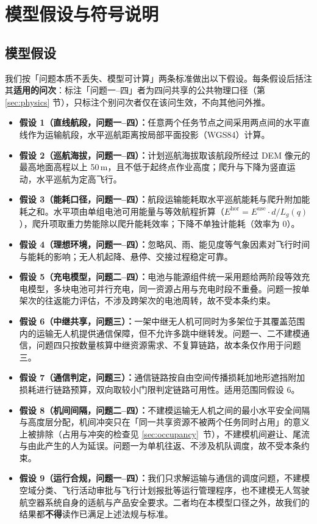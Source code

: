 \section{模型假设与符号说明}

\subsection{模型假设}
我们按「问题本质不丢失、模型可计算」两条标准做出以下假设。每条假设后括注其\textbf{适用的问次}：标注「问题一--四」者为四问共享的公共物理口径（第 \ref{sec:physics} 节），只标注个别问次者仅在该问生效，不向其他问外推。

\begin{itemize}
	\item \textbf{假设 1（直线航段，问题一--四）：}任意两个任务节点之间采用两点间的水平直线作为运输航段，水平巡航距离按局部平面投影（WGS84）计算。
	\item \textbf{假设 2（巡航海拔，问题一--四）：}计划巡航海拔取该航段所经过 DEM 像元的最高地面高程以上 50\,m，且不低于起终点作业高度；爬升与下降为竖直运动，水平巡航为定高飞行。
	\item \textbf{假设 3（能耗口径，问题一--四）：}航段运输能耗取水平巡航能耗与爬升附加能耗之和。水平项由单组电池可用能量与等效航程折算（$E^{\mathrm{hor}}=E^{\mathrm{use}}\cdot d/L_g(q)$），爬升项取重力势能除以爬升能耗效率；下降不单独计能耗（效率为 0）。
	\item \textbf{假设 4（理想环境，问题一--四）：}忽略风、雨、能见度等气象因素对飞行时间与能耗的影响；无人机起降、悬停、交接过程稳定可靠。
	\item \textbf{假设 5（充电模型，问题二--四）：}电池与能源组件统一采用题给两阶段等效充电模型，多块电池可并行充电，同一资源占用与充电时段不重叠。问题一按单架次的往返能力评估，不涉及跨架次的电池周转，故不受本条约束。
	\item \textbf{假设 6（中继共享，问题三）：}一架中继无人机可同时为多架位于其覆盖范围内的运输无人机提供通信保障，但不允许多跳中继转发。问题一、二不建模通信，问题四只按数量核算中继资源需求、不复算链路，故本条仅作用于问题三。
	\item \textbf{假设 7（通信判定，问题三）：}通信链路按自由空间传播损耗加地形遮挡附加损耗进行链路预算，双向取较小门限判定链路可用性。适用范围同假设 6。
	\item \textbf{假设 8（机间间隔，问题二--四）：}不建模运输无人机之间的最小水平安全间隔与高度层分配，机间冲突只在「同一共享资源不被两个任务同时占用」的意义上被排除（占用与冲突的检查见 \ref{sec:occupancy}~节），不建模机间避让、尾流与由此产生的人为延误。问题一为单机往返、不涉及机队调度，故不受本条约束。
	\item \textbf{假设 9（运行合规，问题一--四）：}我们只求解运输与通信的调度问题，不建模空域分类、飞行活动审批与飞行计划报批等运行管理程序\cite{guowuyuan2023feixing,mot2024ccar92}，也不建模无人驾驶航空器系统自身的适航与产品安全要求\cite{samr2023uavsafety}。二者均在本模型口径之外，故我们的结果都\textbf{不得}读作已满足上述法规与标准。
\end{itemize}

